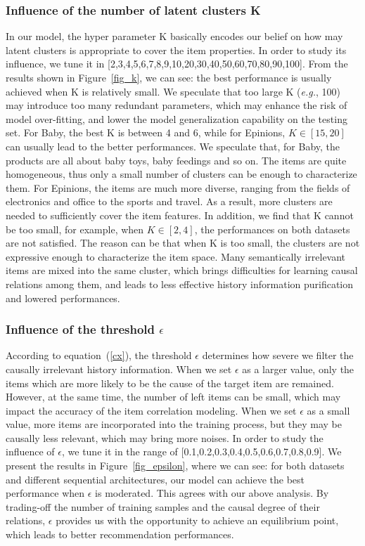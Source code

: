 \documentclass[conference]{IEEEtran}
\theoremstyle{definition}
\theoremstyle{theorem}
\theoremstyle{proof}
\theoremstyle{remark}
\begin{document}
\subsubsection{Influence of the number of latent clusters K}
In our model, the hyper parameter K basically encodes our belief on how may latent clusters is appropriate to cover the item properties.
In order to study its influence, we tune it in [2,3,4,5,6,7,8,9,10,20,30,40,50,60,70,80,90,100]. 
From the results shown in Figure~\ref{fig_k}, we can see:
the best performance is usually achieved when K is {relatively} small.
We speculate that too large K (\emph{e.g.}, 100) may introduce too many redundant parameters, which may enhance the risk of model over-fitting, and lower the model generalization capability on the testing set.
For Baby, the best K is between 4 and 6, while for Epinions, $K\in [15, 20]$ can usually lead to the better performances.
We speculate that, for Baby, the products are all about baby toys, baby feedings and so on.
The items are quite homogeneous, thus only a small number of clusters can be enough to characterize them.
For Epinions, the items are much more diverse, ranging from the fields of electronics and office to the sports and travel.
As a result, more clusters are needed to sufficiently cover the item features.
In addition, we find that K cannot be too small, for example, when $K\in [2, 4]$, the performances on both datasets are not satisfied.
The reason can be that when K is too small, the clusters are not expressive enough to characterize the item space.
Many semantically irrelevant items are mixed into the same cluster, which brings difficulties for learning causal relations among them, and leads to less effective history information purification and lowered performances.


\subsubsection{Influence of the threshold $\epsilon$}
According to equation~(\ref{cx}), the threshold $\epsilon$ determines how severe we filter the causally irrelevant history information.
When we set $\epsilon$ as a larger value, only the items which are more likely to be the cause of the target item are remained.
However, at the same time, the number of left items can be small, which may impact the accuracy of the item correlation modeling.
When we set $\epsilon$ as a small value, more items are incorporated into the training process, but they may be causally less relevant, which may bring more noises.
In order to study the influence of $\epsilon$, we tune it in the range of [0.1,0.2,0.3,0.4,0.5,0.6,0.7,0.8,0.9].
We present the results in Figure~\ref{fig_epsilon}, where we can see:
for both datasets and different sequential architectures, our model can achieve the best performance when $\epsilon$ is moderated.
This agrees with our above analysis.
By trading-off the number of training samples and the causal degree of their relations, $\epsilon$ provides us with the opportunity to achieve an equilibrium point, which {leads} to better recommendation performances.
\end{document}
